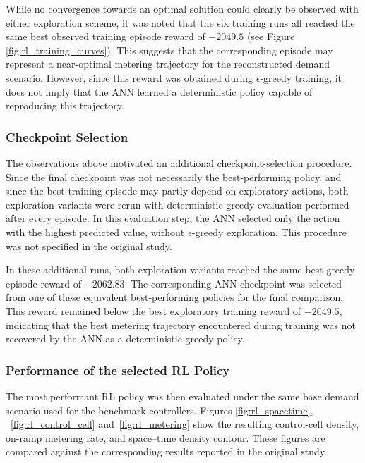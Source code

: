 While no convergence towards an optimal solution could clearly be observed with either exploration scheme, it was noted that the six training runs all reached the same best observed training episode reward of
\(-2049.5\) (see Figure \ref{fig:rl_training_curves}). This suggests that the corresponding episode may represent a
near-optimal metering trajectory for the reconstructed demand scenario.
However, since this reward was obtained during \(\epsilon\)-greedy training, it
does not imply that the ANN learned a deterministic policy capable of
reproducing this trajectory.

\subsubsection{Checkpoint Selection}

The observations above motivated an additional checkpoint-selection procedure.
Since the final checkpoint was not necessarily the best-performing policy, and
since the best training episode may partly depend on exploratory actions, both
exploration variants were rerun with deterministic greedy evaluation performed
after every episode. In this evaluation step, the ANN selected only the action
with the highest predicted value, without \(\epsilon\)-greedy exploration. This
procedure was not specified in the original study.

In these additional runs, both exploration variants reached the same best greedy
episode reward of \(-2062.83\). The corresponding ANN checkpoint was selected
from one of these equivalent best-performing policies for the final comparison.
This reward remained below the best exploratory training reward of \(-2049.5\),
indicating that the best metering trajectory encountered during training was not
recovered by the ANN as a deterministic greedy policy.



\subsubsection{Performance of the selected RL Policy}

The most performant RL policy was then evaluated under the same base demand
scenario used for the benchmark controllers. Figures
\ref{fig:rl_spacetime}, ~\ref{fig:rl_control_cell} and~\ref{fig:rl_metering} show the resulting
control-cell density, on-ramp metering rate, and space--time density contour.
These figures are compared against the corresponding results reported in the
original study.

